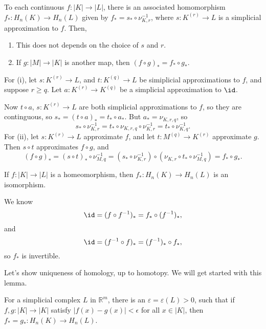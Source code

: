 \documentclass[12pt]{article}
\begin{document}
\begin{proposition}
	To each continuous $f : |K| \to |L|$, there is an associated homomorphism $f_\ast : H_n(K) \to H_n(L)$ given by $f_\ast = s_\ast \circ \nu_{K, r}^{-1}$, where $s : K^{(r)} \to L$ is a simplicial approximation to $f$. Then,
	\begin{enumerate}[\normalfont(i)]
		\item This does not depends on the choice of $s$ and $r$.
		\item If $g : |M| \to |K|$ is another map, then $(f \circ g)_\ast = f_\ast \circ g_\ast$.
	\end{enumerate}
\end{proposition}

\begin{proofbox}
	For (i), let $s : K^{(r)} \to L$, and $t : K^{(q)} \to L$ be simiplicial approximations to $f$, and suppose $r \geq q$. Let $a : K^{(r)} \to K^{(q)}$ be a simplicial approximation to $\id$.

	Now $t \circ a$, $s : K^{(r)} \to L$ are both simplicial approximations to $f$, so they are continguous, so $s_\ast = (t \circ a)_\ast = t_\ast \circ a_\ast$. But $a_\ast = \nu_{K, r, q}$, so
	\[
	s_\ast \circ \nu_{K, r}^{-1} = t_\ast \circ \nu_{K, r, q} \circ \nu_{K, r}^{-1} = t_\ast \circ \nu_{K, q}^{-1}.
	\]
	For (ii), let $s :  K^{(r)} \to L$ approximate $f$, and let $t : M^{(q)} \to K^{(r)}$ approximate $g$. Then $s \circ t$ approximates $f \circ g$, and
	\[
		(f \circ g)_\ast = (s \circ t)_\ast \circ \nu_{M, q}^{-1} = (s_\ast \circ \nu_{K, r}^{-1}) \circ (\nu_{K, r} \circ t_\ast \circ \nu_{M, q}^{-1}) = f_\ast \circ g_\ast.
	\]
\end{proofbox}

\begin{corollary}
	If $f : |K| \to |L|$ is a homeomorphism, then $f_\ast : H_n(K) \to H_n(L)$ is an isomorphism.
\end{corollary}

\begin{proofbox}
	We know
	\[
	\id = (f \circ f^{-1})_\ast = f_\ast \circ (f^{-1})_\ast,
	\]
	and
	\[
	\id = (f^{-1} \circ f)_\ast = (f^{-1})_\ast \circ f_\ast,
	\]
	so $f_\ast$ is invertible.
\end{proofbox}

Let's show uniqueness of homology, up to homotopy. We will get started with this lemma.

\begin{lemma}
	For a simplicial complex $L$ in $\mathbb{R}^m$, there is an $\varepsilon = \varepsilon(L) > 0$, such that if $f, g : |K| \to |K|$ satisfy $|f(x) - g(x)| < \epsilon$ for all $x \in |K|$, then $f_\ast = g_\ast : H_n(K) \to H_n(L)$.
\end{lemma}
\end{document}
